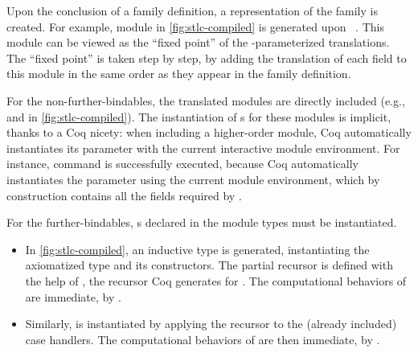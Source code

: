 
Upon the conclusion of a family definition,
a representation of the family is created.
For example, module  in \cref{fig:stlc-compiled} is generated
upon ~.
%
This module can be viewed as the ``fixed point'' of the
-parameterized translations.
The ``fixed point'' is taken step by step, by adding the translation of
each field to this module in the same order as they appear in the family
definition.

For the non-further-bindables, the translated modules are directly included
(e.g.,  and  in \cref{fig:stlc-compiled}).
%
The instantiation of s for these modules is implicit, thanks to a Coq nicety:
when including a higher-order module, Coq automatically instantiates its
parameter with the current interactive module environment.
For instance, command  is successfully executed,
because Coq automatically instantiates the  parameter using the current
module environment, which by construction contains all the fields required by .

For the further-bindables, s declared in the module types must be instantiated.
%
\begin{itemize}
  [align=left,itemsep=2pt,labelsep=*,leftmargin=*]

\item
In \cref{fig:stlc-compiled},
an inductive type  is generated, instantiating the axiomatized
 type and its constructors.
%
The partial recursor  is defined
with the help of , the recursor Coq generates for .
The computational behaviors of  are immediate, by .

\item
Similarly,  is instantiated by applying the recursor 
to the (already included) case handlers. %
The computational behaviors of  are then immediate, by .

\end{itemize}

